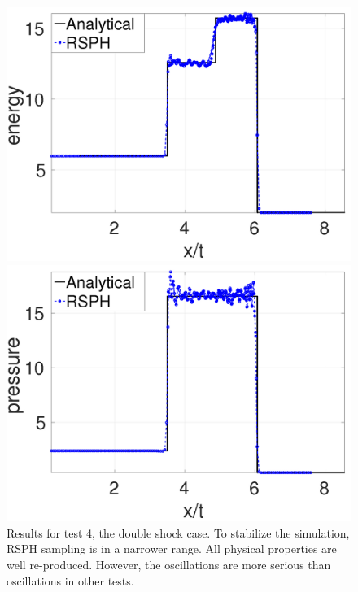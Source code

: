 \documentclass[review]{elsarticle}
\begin{document}
\begin{figure}[H]
\begin{minipage}{.415\textwidth}
        \includegraphics[width=0.99 \textwidth]{./Figures/Dshock-RCM-e-Rp6}
    \end{minipage}%
    \begin{minipage}{.415 \textwidth}
        \centering
        \includegraphics[width=0.99 \textwidth]{./Figures/Dshock-RCM-p-Rp6}
    \end{minipage}%
    \caption{Results for test 4, the double shock case. To stabilize the simulation, RSPH sampling is in a narrower range. All physical properties are well re-produced. However, the oscillations are more serious than oscillations in other tests.}
    \label{fig:RCM-double-shock}
\end{figure}
\end{document}

